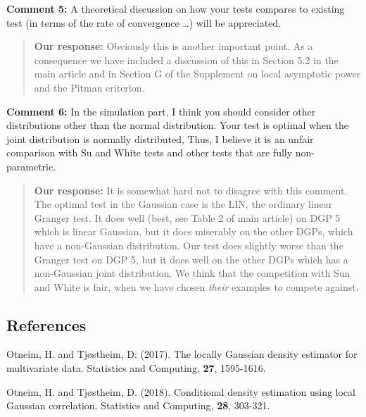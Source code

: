 \documentclass[
  12pt,
  letterpaper]{article}
\numberwithin{equation}{section}
\begin{document}
\textbf{Comment 5:} A theoretical discussion on how your tests compares to existing test (in terms of the rate of convergence \ldots) will be appreciated.

\begin{quote}
\textbf{Our response:} Obviously this is another important point. As a consequence we have included a discussion of this in Section 5.2 in the main article and in Section G of the Supplement on local asymptotic power and the Pitman criterion.
\end{quote}

\textbf{Comment 6:} In the simulation part, I think you should consider other distributions other than the normal distribution. Your test is optimal when the joint distribution is normally distributed, Thus, I believe it is an unfair comparison with Su and White tests and other tests that are fully non-parametric.

\begin{quote}
\textbf{Our response:} It is somewhat hard not to disagree with this comment. The optimal test in the Gaussian case is the LIN, the ordinary linear Granger test. It does well (best, see Table 2 of main article) on DGP 5 which is linear Gaussian, but it does miserably on the other DGPs, which have a non-Gaussian distribution. Our test does slightly worse than the Granger test on DGP 5, but it does well on the other DGPs which has a non-Gaussian joint distribution. We think that the competition with Sun and White is fair, when we have chosen \emph{their} examples to compete against.
\end{quote}

\hypertarget{references}{%
\subsection{References}\label{references}}

Otneim, H. and Tjøstheim, D: (2017). The locally Gaussian density estimator for multivariate data. Statistics and Computing, \textbf{27}, 1595-1616.

Otneim, H. and Tjøstheim, D. (2018). Conditional density estimation using local Gaussian correlation. Statistics and Computing, \textbf{28}, 303-321.
\end{document}
